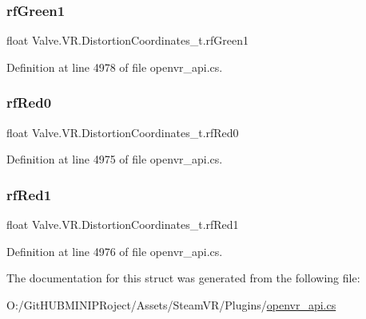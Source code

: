 \subsubsection{\texorpdfstring{rfGreen1}{rfGreen1}}
{\footnotesize\ttfamily float Valve.\+V\+R.\+Distortion\+Coordinates\+\_\+t.\+rf\+Green1}



Definition at line 4978 of file openvr\+\_\+api.\+cs.

\mbox{\label{struct_valve_1_1_v_r_1_1_distortion_coordinates__t_a9fb8f14958cc0bed1310e89b6eadeb53}} 
\subsubsection{\texorpdfstring{rfRed0}{rfRed0}}
{\footnotesize\ttfamily float Valve.\+V\+R.\+Distortion\+Coordinates\+\_\+t.\+rf\+Red0}



Definition at line 4975 of file openvr\+\_\+api.\+cs.

\mbox{\label{struct_valve_1_1_v_r_1_1_distortion_coordinates__t_ac07d53966ee3e9585191bcedf7db44cb}} 
\subsubsection{\texorpdfstring{rfRed1}{rfRed1}}
{\footnotesize\ttfamily float Valve.\+V\+R.\+Distortion\+Coordinates\+\_\+t.\+rf\+Red1}



Definition at line 4976 of file openvr\+\_\+api.\+cs.



The documentation for this struct was generated from the following file\+:\begin{DoxyCompactItemize}
\item 
O\+:/\+Git\+H\+U\+B\+M\+I\+N\+I\+P\+Roject/\+Assets/\+Steam\+V\+R/\+Plugins/\mbox{\hyperlink{openvr__api_8cs}{openvr\+\_\+api.\+cs}}\end{DoxyCompactItemize}
